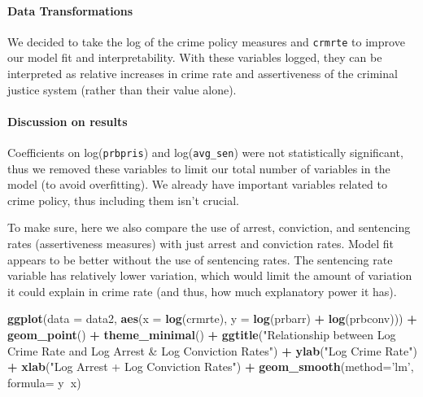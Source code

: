 \documentclass[]{article}
\newenvironment{Shaded}{\begin{snugshade}}{\end{snugshade}}
\newcommand{\DataTypeTok}[1]{\textcolor[rgb]{0.13,0.29,0.53}{#1}}
\newcommand{\KeywordTok}[1]{\textcolor[rgb]{0.13,0.29,0.53}{\textbf{#1}}}
\newcommand{\NormalTok}[1]{#1}
\newcommand{\OperatorTok}[1]{\textcolor[rgb]{0.81,0.36,0.00}{\textbf{#1}}}
\newcommand{\StringTok}[1]{\textcolor[rgb]{0.31,0.60,0.02}{#1}}
\let\oldparagraph\paragraph
\renewcommand{\paragraph}[1]{\oldparagraph{#1}\mbox{}}
\begin{document}
\hypertarget{data-transformations}{%
\paragraph{Data Transformations}\label{data-transformations}}

We decided to take the log of the crime policy measures and
\texttt{crmrte} to improve our model fit and interpretability. With
these variables logged, they can be interpreted as relative increases in
crime rate and assertiveness of the criminal justice system (rather than
their value alone).

\hypertarget{discussion-on-results}{%
\paragraph{Discussion on results}\label{discussion-on-results}}

Coefficients on log(\texttt{prbpris}) and log(\texttt{avg\_sen}) were
not statistically significant, thus we removed these variables to limit
our total number of variables in the model (to avoid overfitting). We
already have important variables related to crime policy, thus including
them isn't crucial.

To make sure, here we also compare the use of arrest, conviction, and
sentencing rates (assertiveness measures) with just arrest and
conviction rates. Model fit appears to be better without the use of
sentencing rates. The sentencing rate variable has relatively lower
variation, which would limit the amount of variation it could explain in
crime rate (and thus, how much explanatory power it has).

\begin{Shaded}
\begin{Highlighting}[]
\KeywordTok{ggplot}\NormalTok{(}\DataTypeTok{data =}\NormalTok{ data2, }\KeywordTok{aes}\NormalTok{(}\DataTypeTok{x =} \KeywordTok{log}\NormalTok{(crmrte), }\DataTypeTok{y =} \KeywordTok{log}\NormalTok{(prbarr) }\OperatorTok{+}\StringTok{ }\KeywordTok{log}\NormalTok{(prbconv))) }\OperatorTok{+}
\StringTok{  }\KeywordTok{geom_point}\NormalTok{() }\OperatorTok{+}
\StringTok{  }\KeywordTok{theme_minimal}\NormalTok{()  }\OperatorTok{+}
\StringTok{  }\KeywordTok{ggtitle}\NormalTok{(}\StringTok{"Relationship between Log Crime Rate and Log Arrest & Log Conviction Rates"}\NormalTok{) }\OperatorTok{+}\StringTok{ }
\StringTok{  }\KeywordTok{ylab}\NormalTok{(}\StringTok{"Log Crime Rate"}\NormalTok{) }\OperatorTok{+}\StringTok{ }\KeywordTok{xlab}\NormalTok{(}\StringTok{"Log Arrest + Log Conviction Rates"}\NormalTok{) }\OperatorTok{+}
\StringTok{  }\KeywordTok{geom_smooth}\NormalTok{(}\DataTypeTok{method=}\StringTok{'lm'}\NormalTok{, }\DataTypeTok{formula=}\NormalTok{ y}\OperatorTok{~}\NormalTok{x)}
\end{Highlighting}
\end{Shaded}
\end{document}

